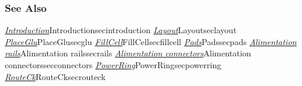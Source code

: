 \begin{htmlonly}

\subsubsection{See Also}

\hyperref[ref]{\emph{Introduction}}{}{Introduction}{secintroduction}
\hyperref[ref]{\emph{Layout}}{}{Layout}{seclayout}
\hyperref[ref]{\emph{PlaceGlu}}{}{PlaceGlu}{secglu}
\hyperref[ref]{\emph{FillCell}}{}{FillCell}{secfillcell}
\hyperref[ref]{\emph{Pads}}{}{Pads}{secpads}
\hyperref[ref]{\emph{Alimentation rails}}{}{Alimentation rails}{secrails}
\hyperref[ref]{\emph{Alimentation connectors}}{}{Alimentation connectors}{secconnectors}
\hyperref[ref]{\emph{PowerRing}}{}{PowerRing}{secpowerring}
\hyperref[ref]{\emph{RouteCk}}{}{RouteCk}{secrouteck}

\end{htmlonly}
